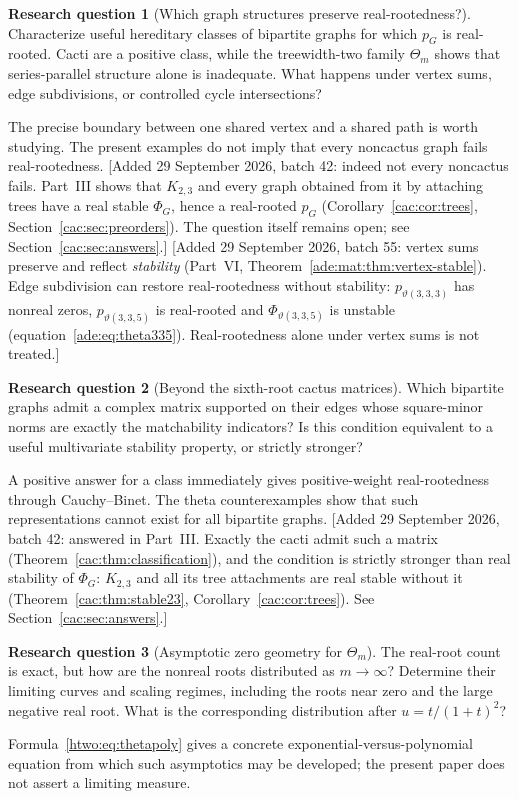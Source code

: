 \documentclass[11pt]{article}
\numberwithin{equation}{section}
\theoremstyle{definition}
\newtheorem{question}{Research question}%
\begin{document}
\begin{question}[Which graph structures preserve real-rootedness?]\label{ade:hq:preserve}%
Characterize useful hereditary classes of bipartite graphs for which
$p_G$ is real-rooted. Cacti are a positive class, while the treewidth-two
family $\Theta_m$ shows that series-parallel structure alone is inadequate.
What happens under vertex sums, edge subdivisions, or controlled cycle
intersections?
\end{question}
The precise boundary between one shared vertex and a shared path is worth
studying. The present examples do not imply that every noncactus graph
fails real-rootedness.
[Added 29 September 2026, batch 42: indeed not every noncactus fails.
Part~III shows that $K_{2,3}$ and every graph obtained from it by attaching
trees have a real stable $\Phi_G$, hence a real-rooted $p_G$
(Corollary~\ref{cac:cor:trees}, Section~\ref{cac:sec:preorders}). The
question itself remains open; see Section~\ref{cac:sec:answers}.]
[Added 29 September 2026, batch 55: vertex sums preserve and reflect
\emph{stability} (Part~VI, Theorem~\ref{ade:mat:thm:vertex-stable}). Edge
subdivision can restore real-rootedness without stability:
$p_{\vartheta(3,3,3)}$ has nonreal zeros, $p_{\vartheta(3,3,5)}$ is
real-rooted and $\Phi_{\vartheta(3,3,5)}$ is unstable
(equation~\eqref{ade:eq:theta335}). Real-rootedness alone under vertex sums
is not treated.]

\begin{question}[Beyond the sixth-root cactus matrices]\label{cac:q:beyond}
Which bipartite graphs admit a complex matrix supported on their edges
whose square-minor norms are exactly the matchability indicators? Is
this condition equivalent to a useful multivariate stability property,
or strictly stronger?
\end{question}
A positive answer for a class immediately gives positive-weight
real-rootedness through Cauchy--Binet. The theta counterexamples show that
such representations cannot exist for all bipartite graphs.
[Added 29 September 2026, batch 42: answered in Part~III. Exactly the cacti
admit such a matrix (Theorem~\ref{cac:thm:classification}), and the
condition is strictly stronger than real stability of $\Phi_G$: $K_{2,3}$
and all its tree attachments are real stable without it
(Theorem~\ref{cac:thm:stable23}, Corollary~\ref{cac:cor:trees}). See
Section~\ref{cac:sec:answers}.]

\begin{question}[Asymptotic zero geometry for $\Theta_m$]
The real-root count is exact, but how are the nonreal roots distributed
as $m\to\infty$? Determine their limiting curves and scaling regimes,
including the roots near zero and the large negative real root. What
is the corresponding distribution after $u=t/(1+t)^2$?
\end{question}
Formula~\eqref{htwo:eq:thetapoly} gives a concrete exponential-versus-polynomial
equation from which such asymptotics may be developed; the present paper
does not assert a limiting measure.
\end{document}
